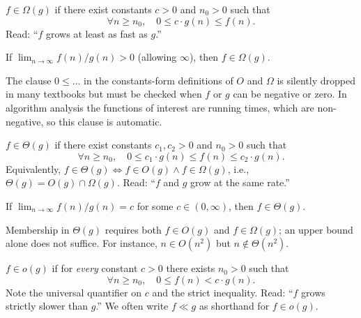 \begin{definition}
\label{def:big_omega}
$f \in \Omega(g)$ if there exist constants $c > 0$ and $n_0 > 0$ such that
\[
  \forall n \ge n_0,\quad 0 \le c \cdot g(n) \le f(n).
\]
Read: ``$f$ grows at least as fast as $g$.''
\end{definition}

\begin{remark}
If $\lim_{n \to \infty} f(n)/g(n) > 0$ (allowing $\infty$), then $f \in \Omega(g)$.
\end{remark}

\begin{remark}
The clause $0 \le \dots$ in the constants-form definitions of $O$ and $\Omega$ is silently dropped in many textbooks but must be checked when $f$ or $g$ can be negative or zero. In algorithm analysis the functions of interest are running times, which are non-negative, so this clause is automatic.
\end{remark}

\begin{definition}
\label{def:big_theta}
$f \in \Theta(g)$ if there exist constants $c_1, c_2 > 0$ and $n_0 > 0$ such that
\[
  \forall n \ge n_0,\quad 0 \le c_1 \cdot g(n) \le f(n) \le c_2 \cdot g(n).
\]
Equivalently, $f \in \Theta(g) \iff f \in O(g) \wedge f \in \Omega(g)$, i.e., $\Theta(g) = O(g) \cap \Omega(g)$. Read: ``$f$ and $g$ grow at the same rate.''
\end{definition}

\begin{remark}
If $\lim_{n \to \infty} f(n)/g(n) = c$ for some $c \in (0, \infty)$, then $f \in \Theta(g)$.
\end{remark}

\begin{remark}
Membership in $\Theta(g)$ requires both $f \in O(g)$ and $f \in \Omega(g)$; an upper bound alone does not suffice. For instance, $n \in O(n^2)$ but $n \notin \Theta(n^2)$.
\end{remark}

\begin{definition}[little-o]
\label{def:little_o}
$f \in o(g)$ if for \emph{every} constant $c > 0$ there exists $n_0 > 0$ such that
\[
  \forall n \ge n_0,\quad 0 \le f(n) < c \cdot g(n).
\]
Note the universal quantifier on $c$ and the strict inequality. Read: ``$f$ grows strictly slower than $g$.'' We often write $f \ll g$ as shorthand for $f \in o(g)$.
\end{definition}

